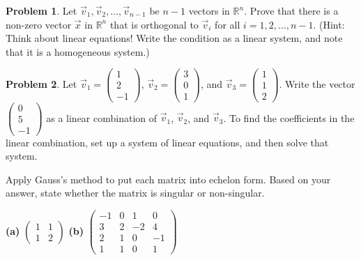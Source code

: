 \documentclass[12pt]{article}
\newcommand{\R}{{\mathbb R}}
\theoremstyle{definition}
\newtheorem{problem}{Problem}
\newenvironment{answer}{\bgroup\color{darkblue}}{\egroup}
\begin{document}
\begin{answer}
\end{answer}



\begin{problem}
Let $\vec v_1, \vec v_2, \dots, \vec v_{n-1}$ be $n-1$ vectors in $\R^n$.  Prove that there
is a non-zero vector $\vec x$ in $\R^n$ that is orthogonal to $\vec v_i$ for all $i=1,2,\dots,n-1$.
(Hint: Think about linear equations!  Write the condition as a linear system, and note that
it is a homogeneous system.)
\end{problem}

\begin{answer}
\end{answer}



\begin{problem}
Let $\vec v_1=\begin{pmatrix} 1\\2\\-1 \end{pmatrix}$,
    $\vec v_2=\begin{pmatrix} 3\\0\\1 \end{pmatrix}$, and
    $\vec v_3=\begin{pmatrix} 1\\1\\2 \end{pmatrix}$.  
    Write the vector $\begin{pmatrix} 0\\5\\-1 \end{pmatrix}$
as a linear combination of $\vec v_1$, $\vec v_2$, and $\vec v_3$. To find the coefficients
in the linear combination, set up a system of linear equations, and then solve that system.
\end{problem}

\begin{answer}
\end{answer}


\problem Apply Gauss's method to put each matrix into echelon form.
Based on your answer, state whether the matrix is singular or non-singular. 

\medskip

\textbf{(a)} 
   $\begin{pmatrix}
      1& 1\\
      1& 2
   \end{pmatrix}$
\qquad\qquad\textbf{(b)}
   $\begin{pmatrix}
      -1& 0& 1& 0\\
      3& 2& -2&4\\
      2& 1& 0& -1\\
      1& 1&0 &1 
   \end{pmatrix}$


\begin{answer}
\end{answer}
\end{document}

